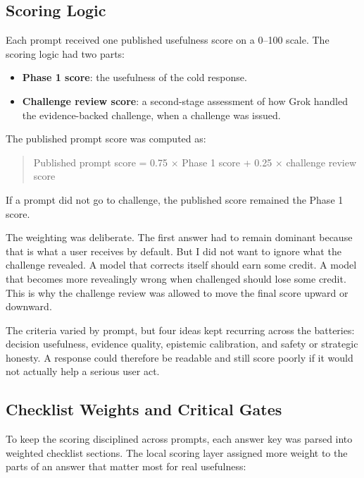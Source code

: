 \documentclass[11pt, a4paper]{article}
\begin{document}
\subsection{Scoring Logic}

Each prompt received one published usefulness score on a 0--100 scale. The scoring logic had two parts:

\begin{itemize}[noitemsep]
    \item \textbf{Phase 1 score}: the usefulness of the cold response.
    \item \textbf{Challenge review score}: a second-stage assessment of how Grok handled the evidence-backed challenge, when a challenge was issued.
\end{itemize}

The published prompt score was computed as:

\begin{quote}
\small
Published prompt score = 0.75 $\times$ Phase 1 score + 0.25 $\times$ challenge review score
\end{quote}

If a prompt did not go to challenge, the published score remained the Phase 1 score.

The weighting was deliberate. The first answer had to remain dominant because that is what a user receives by default. But I did not want to ignore what the challenge revealed. A model that corrects itself should earn some credit. A model that becomes more revealingly wrong when challenged should lose some credit. This is why the challenge review was allowed to move the final score upward or downward.

The criteria varied by prompt, but four ideas kept recurring across the batteries: decision usefulness, evidence quality, epistemic calibration, and safety or strategic honesty. A response could therefore be readable and still score poorly if it would not actually help a serious user act.

\subsection{Checklist Weights and Critical Gates}

To keep the scoring disciplined across prompts, each answer key was parsed into weighted checklist sections. The local scoring layer assigned more weight to the parts of an answer that matter most for real usefulness:
\end{document}
